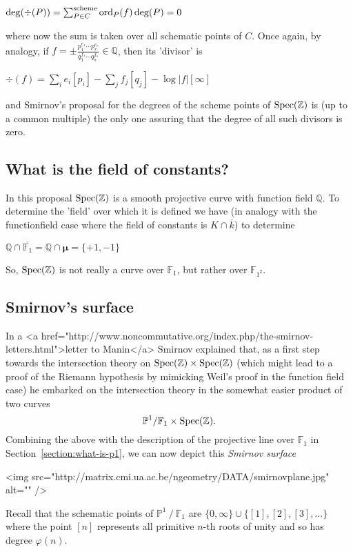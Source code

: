 $\deg(\div(P)) = \sum^{\text{scheme}}_{P \in C}\operatorname{ord}_P(f) \deg(P) = 0$

where now the sum is taken over all schematic points of $C$. Once again, by analogy, if $f = \pm \frac{p_1^{e_1} \cdots p_r^{e_r}}{q_1^{f_1} \cdots q_s^{f_s}} \in \mathbb{Q}$, then its 'divisor' is

$\div(f) = \sum_i e_i [p_i] - \sum_j f_j [q_j] - \log |f| [\infty]$

and Smirnov's proposal for the degrees of the scheme points of $\operatorname{Spec}(\mathbb{Z})$ is (up to a common multiple) the only one assuring that the degree of all such divisors is zero.

\subsection{What is the field of constants?}

In this proposal $\operatorname{Spec}(\mathbb{Z})$ is a smooth projective curve with function field $\mathbb{Q}$. To determine the 'field' over which it is defined we have (in analogy with the functionfield case where the field of constants is $K \cap \overline{k}$) to determine

$\mathbb{Q} \cap \overline{\mathbb{F}_1} = \mathbb{Q} \cap \pmb{\mu} = \{ +1,-1 \}$

So, $\operatorname{Spec}(\mathbb{Z})$ is not really a curve over $\mathbb{F}_1$, but rather over $\mathbb{F}_{1^2}$.

\subsection{Smirnov's surface}

In a <a href="http://www.noncommutative.org/index.php/the-smirnov-letters.html">letter to Manin</a> Smirnov explained that, as a first step towards the intersection theory on $\operatorname{Spec}(\mathbb{Z}) \times \operatorname{Spec}(\mathbb{Z})$ (which might lead to a proof of the Riemann hypothesis by mimicking Weil's proof in the function field case) he embarked on the intersection theory in the somewhat easier product of two curves
\begin{equation}
  \mathbb{P}^1/\mathbb{F}_1\times\operatorname{Spec}(\mathbb{Z}).
\end{equation}
Combining the above with the description of the projective line over $\mathbb{F}_1$ in Section~\ref{section:what-is-p1}, we can now depict this \emph{Smirnov surface}

<img src="http://matrix.cmi.ua.ac.be/ngeometry/DATA/smirnovplane.jpg" alt="" />

Recall that the schematic points of $\mathbb{P}^1~/~\mathbb{F}_1$ are $\{ 0,\infty \} \cup \{  [1],[2],[3],\ldots \}$ where the point $[n]$ represents all primitive $n$-th roots of unity and so has degree $\varphi(n)$.

